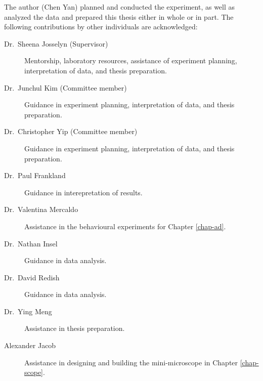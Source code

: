 The author (Chen Yan) planned and conducted the experiment, as well as analyzed the data and prepared this thesis either in whole or in part. The following contributions by other individuals are acknowledged:
\begin{description}

\item[Dr.~Sheena Josselyn (Supervisor)] Mentorship, laboratory resources, assistance of experiment planning, interpretation of data, and thesis preparation.

\item[Dr.~Junchul Kim (Committee member)] Guidance in experiment planning, interpretation of data, and thesis preparation.

\item[Dr.~Christopher Yip (Committee member)] Guidance in experiment planning, interpretation of data, and thesis preparation.

\item[Dr.~Paul Frankland] Guidance in interepretation of results.

\item[Dr.~Valentina Mercaldo] Assistance in the behavioural experiments for Chapter \ref{chap-ad}.

\item[Dr.~Nathan Insel] Guidance in data analysis.

\item[Dr.~David Redish] Guidance in data analysis. 

\item[Dr.~Ying Meng] Assistance in thesis preparation.

\item[Alexander Jacob] Assistance in designing and building the mini-microscope in Chapter \ref{chap-scope}.

\end{description}
